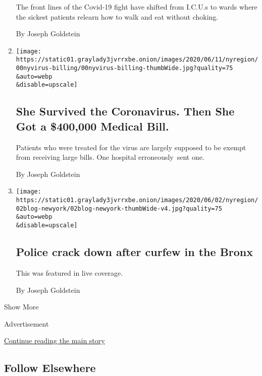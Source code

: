 \begin{enumerate}
  The front lines of the Covid-19 fight have shifted from I.C.U.s to
  wards where the sickest patients relearn how to walk and eat without
  choking.

  By Joseph Goldstein
\item
  \href{/2020/06/14/nyregion/coronavirus-billing-nyc.html}{}

  \texttt{[image: https://static01.graylady3jvrrxbe.onion/images/2020/06/11/nyregion/00nyvirus-billing/00nyvirus-billing-thumbWide.jpg?quality=75\\\&auto=webp\\\&disable=upscale]}

  \hypertarget{she-survived-the-coronavirus-then-she-got-a-400000-medical-bill}{%
  \subsection{She Survived the Coronavirus. Then She Got a \$400,000
  Medical
  Bill.}\label{she-survived-the-coronavirus-then-she-got-a-400000-medical-bill}}

  Patients who were treated for the virus are largely supposed to be
  exempt from receiving large bills. One hospital erroneously~sent one.

  By Joseph Goldstein
\item
  \href{/live/2020/protests-george-floyd-police-06-02/police-crack-down-after-curfew-in-the-bronx}{}

  \texttt{[image: https://static01.graylady3jvrrxbe.onion/images/2020/06/02/nyregion/02blog-newyork/02blog-newyork-thumbWide-v4.jpg?quality=75\\\&auto=webp\\\&disable=upscale]}

  \hypertarget{police-crack-down-after-curfew-in-the-bronx}{%
  \subsection{Police crack down after curfew in the
  Bronx}\label{police-crack-down-after-curfew-in-the-bronx}}

  This was featured in live coverage.

  By Joseph Goldstein
\end{enumerate}

Show More

Advertisement

\protect\hyperlink{after-mid2}{Continue reading the main story}

\hypertarget{follow-elsewhere}{%
\subsection{Follow Elsewhere}\label{follow-elsewhere}}

